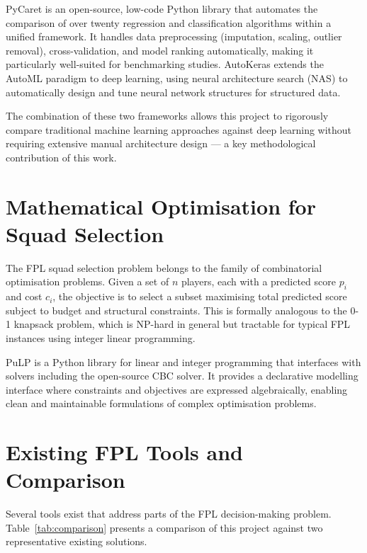 \documentclass[11pt,english,listoffigures,listoftables]{tfgetsinf}
\begin{document}
PyCaret \cite{pycaret} is an open-source, low-code Python library that automates the comparison of over twenty regression and classification algorithms within a unified framework. It handles data preprocessing (imputation, scaling, outlier removal), cross-validation, and model ranking automatically, making it particularly well-suited for benchmarking studies. AutoKeras \cite{autokeras} extends the AutoML paradigm to deep learning, using neural architecture search (NAS) to automatically design and tune neural network structures for structured data.

The combination of these two frameworks allows this project to rigorously compare traditional machine learning approaches against deep learning without requiring extensive manual architecture design --- a key methodological contribution of this work.

\section{Mathematical Optimisation for Squad Selection}

The FPL squad selection problem belongs to the family of combinatorial optimisation problems. Given a set of $n$ players, each with a predicted score $p_i$ and cost $c_i$, the objective is to select a subset maximising total predicted score subject to budget and structural constraints. This is formally analogous to the 0-1 knapsack problem, which is NP-hard in general but tractable for typical FPL instances using integer linear programming.

PuLP \cite{pulp} is a Python library for linear and integer programming that interfaces with solvers including the open-source CBC solver. It provides a declarative modelling interface where constraints and objectives are expressed algebraically, enabling clean and maintainable formulations of complex optimisation problems.

\section{Existing FPL Tools and Comparison}

Several tools exist that address parts of the FPL decision-making problem. Table~\ref{tab:comparison} presents a comparison of this project against two representative existing solutions.
\end{document}
